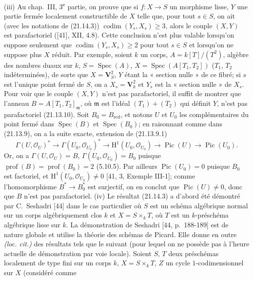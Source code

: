 \begin{env}[21.14.4]
(iii) Au chap.~III, 3\textsuperscript{e} partie, on prouve que si $f:X\to S$ un
morphisme lisse, $Y$ une partie fermée localement constructible de $X$ telle que,
pour tout $s\in S$, on ait (avec les notations de (21.14.3))
$\operatorname{codim}(Y_s,X_s)\geq3$, alors le couple $(X,Y)$ est parafactoriel
([41], XII, 4.8). Cette conclusion n'est plus valable lorsqu'on suppose seulement que
$\operatorname{codim}(Y_s,X_s)\geq2$ pour tout $s\in S$ et lorsqu'on ne suppose plus
$X$ réduit. Par exemple, soient $k$ un corps, $A=k[T]/(T^2)$, algèbre des nombres
duaux sur $k$, $S=\operatorname{Spec}(A)$,
$X=\operatorname{Spec}(A[T_1,T_2])$ ($T_1$, $T_2$ indéterminées), de sorte que
$X=\mathbf V_S^2$, $Y$ étant la « section nulle » de ce fibré; si $s$ est l'unique
point fermé de $S$, on a $X_s=\mathbf V_k^2$ et $Y_s$ est la « section nulle » de
$X_s$. Pour voir que le couple $(X,Y)$ n'est pas parafactoriel, il suffit de montrer
que l'anneau $B=A[T_1,T_2]_\mathfrak m$, où $\mathfrak m$ est l'idéal
$(T_1)+(T_2)$ qui définit $Y$, n'est pas parafactoriel (21.13.10). Soit
$B_0=B_{\mathrm{red}}$, et notons $U$ et $U_0$ les complémentaires du point fermé
dans $\operatorname{Spec}(B)$ et $\operatorname{Spec}(B_0)$; en raisonnant comme
dans (21.13.9), on a la suite exacte, extension de (21.13.9.1)
\[
  \Gamma(U,\mathcal O_U)^*\longrightarrow\Gamma(U_0,\mathcal O_{U_0})^*
  \longrightarrow\mathrm H^1(U_0,\mathcal O_{U_0})
  \longrightarrow\operatorname{Pic}(U)\longrightarrow\operatorname{Pic}(U_0).
\]
Or, on a $\Gamma(U,\mathcal O_U)=B$, $\Gamma(U_0,\mathcal O_{U_0})=B_0$ puisque
$\operatorname{prof}(B)=\operatorname{prof}(B_0)=2$ (5.10.5). Par ailleurs
$\operatorname{Pic}(U_0)=0$ puisque $B_0$ est factoriel, et
$\mathrm H^1(U_0,\mathcal O_{U_0})\neq0$ [41, 3, Exemple III-1]; comme
l'homomorphisme $B^*\to B_0^*$ est surjectif, on en conclut que
$\operatorname{Pic}(U)\neq0$, donc que $B$ n'est pas parafactoriel.
(iv) Le résultat (21.14.3) a d'abord été démontré par C.~Seshadri [44] dans le cas
particulier où $S$ est un schéma algébrique normal sur un corps algébriquement clos
$k$ et $X=S\times_k T$, où $T$ est un $k$-préschéma algébrique lisse sur $k$. La
démonstration de Seshadri [44, p.~188-189] est de nature globale et utilise la
théorie des schémas de Picard. Elle donne en outre \emph{(loc. cit.)} des résultats
tels que le suivant (pour lequel on ne possède pas à l'heure actuelle de démonstration
par voie locale). Soient $S$, $T$ deux préschémas localement de type fini sur un
corps $k$, $X=S\times_k T$, $Z$ un cycle $1$-codimensionnel sur $X$ (considéré comme

\end{env}
